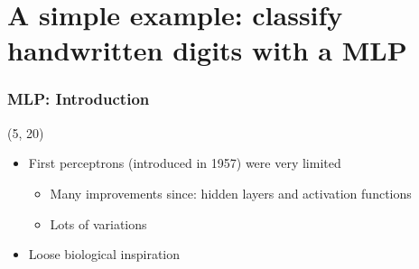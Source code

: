 \section[A simple example: MLP]{A simple example: classify handwritten digits with a \acl{MLP}}

\begin{frame}

  \frametitle{\acl{MLP}: Introduction}

  \begin{textblock}{80}(5, 20)
    \begin{itemize}
    \item<1-> First perceptrons (introduced in 1957) were very limited
      \begin{itemize}
      \item Many improvements since: hidden layers and activation functions
      \item Lots of variations
      \end{itemize}
    \item<1-> Loose biological inspiration
    \end{itemize}
  \end{textblock}
\end{frame}


